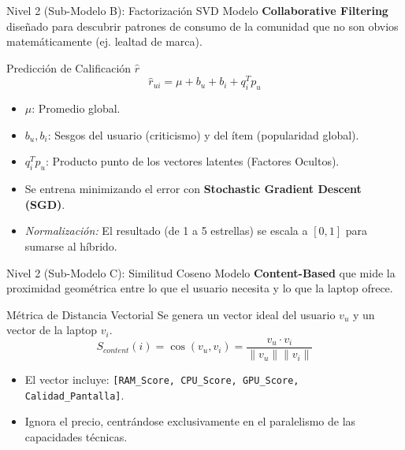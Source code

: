 \documentclass[aspectratio=169]{beamer}
\begin{document}
\begin{frame}{Nivel 2 (Sub-Modelo B): Factorización SVD}
    Modelo \textbf{Collaborative Filtering} diseñado para descubrir patrones de consumo de la comunidad que no son obvios matemáticamente (ej. lealtad de marca).
    
    \begin{block}{Predicción de Calificación $\hat{r}$}
        \begin{equation}
            \hat{r}_{ui} = \mu + b_u + b_i + q_i^T p_u
        \end{equation}
    \end{block}
    
    \begin{itemize}
        \item $\mu$: Promedio global.
        \item $b_u, b_i$: Sesgos del usuario (criticismo) y del ítem (popularidad global).
        \item $q_i^T p_u$: Producto punto de los vectores latentes (Factores Ocultos).
        \item Se entrena minimizando el error con \textbf{Stochastic Gradient Descent (SGD)}.
        \item \textit{Normalización:} El resultado (de 1 a 5 estrellas) se escala a $[0,1]$ para sumarse al híbrido.
    \end{itemize}
\end{frame}

\begin{frame}{Nivel 2 (Sub-Modelo C): Similitud Coseno}
    Modelo \textbf{Content-Based} que mide la proximidad geométrica entre lo que el usuario necesita y lo que la laptop ofrece.
    
    \begin{block}{Métrica de Distancia Vectorial}
        Se genera un vector ideal del usuario $v_u$ y un vector de la laptop $v_i$.
        \begin{equation}
            S_{content}(i) = \cos(v_u, v_i) = \frac{v_u \cdot v_i}{\|v_u\| \|v_i\|}
        \end{equation}
    \end{block}
    
    \begin{itemize}
        \item El vector incluye: \texttt{[RAM\_Score, CPU\_Score, GPU\_Score, Calidad\_Pantalla]}.
        \item Ignora el precio, centrándose exclusivamente en el paralelismo de las capacidades técnicas.
    \end{itemize}
\end{frame}
\end{document}
